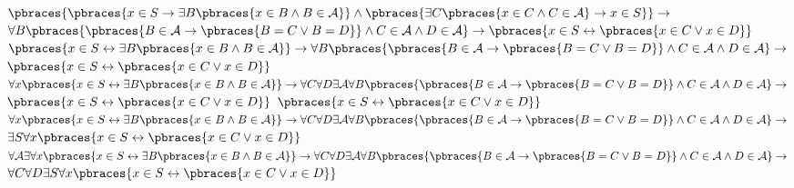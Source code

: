 \begin{solution}
\begin{algorithmic}[1]
	\State $\pbraces{\pbraces{x \in S \rightarrow \exists B \pbraces{x \in B \land B \in \mathcal{A}}} \land \pbraces{\exists C\pbraces{x \in C \land C \in \mathcal{A}} \rightarrow x \in S}} \rightarrow$
	\State $\forall B \pbraces{\pbraces{B \in \mathcal{A} \rightarrow \pbraces{B = C \lor B = D}} \land C \in \mathcal{A} \land D \in \mathcal{A}} \rightarrow \pbraces{x \in S \leftrightarrow \pbraces{x \in C \lor x \in D}}$ 
	\State $\pbraces{x \in S \leftrightarrow \exists B \pbraces{x \in B \land B \in \mathcal{A}}}  \rightarrow \forall B \pbraces{\pbraces{B \in \mathcal{A} \rightarrow \pbraces{B = C \lor B = D}} \land C \in \mathcal{A} \land D \in \mathcal{A}} \rightarrow$
	\State$ \pbraces{x \in S \leftrightarrow \pbraces{x \in C \lor x \in D}}$ 
	\State $\forall x \pbraces{x \in S \leftrightarrow \exists B \pbraces{x \in B \land B \in \mathcal{A}}}  \rightarrow \forall C \forall D \exists \mathcal{A} \forall B \pbraces{\pbraces{B \in \mathcal{A} \rightarrow \pbraces{B = C \lor B = D}} \land C \in \mathcal{A} \land D \in \mathcal{A}} \rightarrow$
	\State$ \pbraces{x \in S \leftrightarrow \pbraces{x \in C \lor x \in D}}$ 
	\State$ \pbraces{x \in S \leftrightarrow \pbraces{x \in C \lor x \in D}}$ 
	\State $\forall x \pbraces{x \in S \leftrightarrow \exists B \pbraces{x \in B \land B \in \mathcal{A}}}  \rightarrow \forall C \forall D \exists \mathcal{A} \forall B \pbraces{\pbraces{B \in \mathcal{A} \rightarrow \pbraces{B = C \lor B = D}} \land C \in \mathcal{A} \land D \in \mathcal{A}} \rightarrow$
	\State$ \exists S \forall x\pbraces{x \in S \leftrightarrow \pbraces{x \in C \lor x \in D}}$ 
	\State $\forall \mathcal{A} \exists \forall x \pbraces{x \in S \leftrightarrow \exists B \pbraces{x \in B \land B \in \mathcal{A}}}  \rightarrow \forall C \forall D \exists \mathcal{A} \forall B \pbraces{\pbraces{B \in \mathcal{A} \rightarrow \pbraces{B = C \lor B = D}} \land C \in \mathcal{A} \land D \in \mathcal{A}} \rightarrow$
	\State$ \forall C \forall D\exists S \forall x\pbraces{x \in S \leftrightarrow \pbraces{x \in C \lor x \in D}}$ 
\end{algorithmic}

\end{solution}
